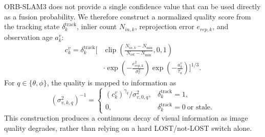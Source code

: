 \documentclass[journal,twoside]{IEEEtran}
\begin{document}
ORB-SLAM3 does not provide a single confidence value that can be used directly as a fusion probability. We therefore construct a normalized quality score from the tracking state $\delta_k^{\mathrm{track}}$, inlier count $N_{in,k}$, reprojection error $e_{rep,k}$, and observation age $a_k^v$:
\begin{equation}
\begin{aligned}
c_k^v=\delta_k^{\mathrm{track}}\Bigg[&
\operatorname{clip}\!\left(\frac{N_{in,k}-N_{\min}}
{N_{\mathrm{ref}}-N_{\min}},0,1\right)\\
&\cdot\exp\!\left(-\frac{e_{rep,k}^2}{\sigma_e^2}\right)
\exp\!\left(-\frac{a_k^v}{\tau_a}\right)\Bigg]^{1/3}.
\end{aligned}
\label{eq:visual_quality}
\end{equation}
For $q\in\{\theta,\phi\}$, the quality is mapped to information as
\begin{equation}
(\sigma_{v,k,q}^{2})^{-1}=
\begin{cases}
(c_k^v)^{\gamma_q}/\sigma_{v,0,q}^{2},&\delta_k^{\mathrm{track}}=1,\\
0,&\delta_k^{\mathrm{track}}=0\ \text{or stale}.
\end{cases}
\label{eq:visual_variance}
\end{equation}
This construction produces a continuous decay of visual information as image quality degrades, rather than relying on a hard LOST/not-LOST switch alone.
\end{document}
